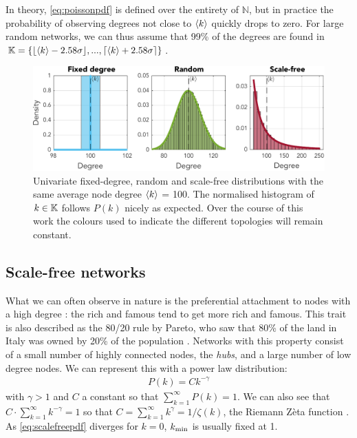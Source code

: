 In theory, \eqref{eq:poissonpdf} is defined over the entirety of $\mathbb{N}$, but in practice the probability of observing degrees not close to ${\langle k\rangle}$ quickly drops to zero. For large random networks, we can thus assume that 99\% of the degrees are found in $\K = \{ \left \lfloor{\kmean - 2.58 \sigma}\right \rfloor, ...,  \left \lceil{\kmean + 2.58 \sigma}\right \rceil \}$.

\begin{figure}[H]
\centering
\includegraphics[width = \textwidth]{../Figures/Distributions/1D.pdf}
\caption{Univariate fixed-degree, random and scale-free distributions with the same average node degree ${\langle k\rangle}$ = 100. The normalised histogram of $k \in {\mathbb{K}}$ follows $P(k)$ nicely as expected. Over the course of this work the colours used to indicate the different topologies will remain constant.}
\label{fig:1Dpdfs}
\end{figure}


\subsection{Scale-free networks}
What we can often observe in nature is the preferential attachment to nodes with a high degree \cite{Bullmore2010}: the rich and famous tend to get more rich and famous. This trait is also described as the 80/20 rule by Pareto, who saw that 80\% of the land in Italy was owned by 20\% of the population \cite{BarabasiNetworkBook2016}. Networks with this property consist of a small number of highly connected nodes, the \textsl{hubs}, and a large number of low degree nodes. We can represent this with a power law distribution:
\begin{align}
P(k) = C k^{-\gamma} \label{eq:scalefreepdf}
\end{align}
with $\gamma > 1$ and $C$ a constant so that $\sum_{k=1}^{\infty} P(k) = 1$. We can also see that $C \cdot \sum_{k=1}^{\infty} k^{-\gamma} = 1$ so that $C = \sum_{k=1}^{\infty} k^{\gamma} = 1/\zeta(k)$, the Riemann Z{\`e}ta function \cite{BarabasiNetworkBook2016}. As \eqref{eq:scalefreepdf} diverges for $k = 0$, $k_{\text{min}}$ is usually fixed at 1.\\

